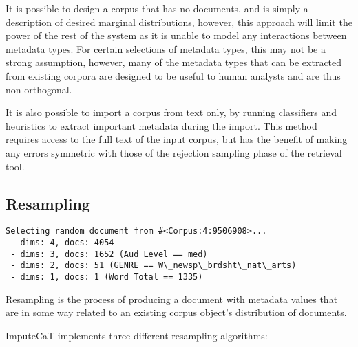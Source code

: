 It is possible to design a corpus that has no documents, and is simply a description of desired marginal distributions, however, this approach will limit the power of the rest of the system as it is unable to model any interactions between metadata types.  For certain selections of metadata types, this may not be a strong assumption, however, many of the metadata types that can be extracted from existing corpora are designed to be useful to human analysts and are thus non-orthogonal.

It is also possible to import a corpus from text only, by running classifiers and heuristics to extract important metadata during the import.  This method requires access to the full text of the input corpus, but has the benefit of making any errors symmetric with those of the rejection sampling phase of the retrieval tool.


\subsection{Resampling}

\begin{lstlisting}
Selecting random document from #<Corpus:4:9506908>...
 - dims: 4, docs: 4054
 - dims: 3, docs: 1652 (Aud Level == med)
 - dims: 2, docs: 51 (GENRE == W\_newsp\_brdsht\_nat\_arts)
 - dims: 1, docs: 1 (Word Total == 1335)
\end{lstlisting}

Resampling is the process of producing a document with metadata values that are in some way related to an existing corpus object's distribution of documents.

ImputeCaT implements three different resampling algorithms:

